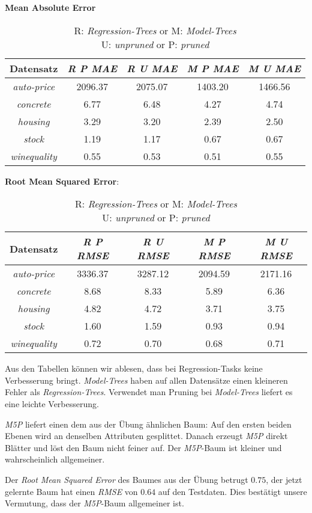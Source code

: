 
\textbf{Mean Absolute Error}

\begin{table}[htb]
	\centering
\begin{tabular}{c|c|c|c|c}
Datensatz  & \emph{R P MAE } & \emph{R U MAE} & \emph{M P MAE} & \emph{M U MAE} \\ \hline
\emph{auto-price}  & 2096.37 & 2075.07& 1403.20 & 1466.56 \\ \hline
\emph{concrete}    & 6.77    & 6.48   & 4.27    & 4.74     \\ \hline
\emph{housing}     & 3.29    & 3.20   & 2.39    & 2.50     \\ \hline
\emph{stock}       & 1.19    & 1.17   & 0.67    & 0.67     \\ \hline
\emph{winequality} & 0.55    & 0.53   & 0.51    & 0.55       
\end{tabular}
\caption{R: \emph{Regression-Trees} or M: \emph{Model-Trees} \\
U: \emph{unpruned} or P: \emph{pruned} }
\end{table}


\textbf{Root Mean Squared Error}:

\begin{table}[htb]
	\centering
\begin{tabular}{c|c|c|c|c}
Datensatz  & \emph{R P RMSE} & \emph{R U RMSE} & \emph{M P RMSE} & \emph{M U RMSE} \\ \hline
\emph{auto-price}  & 3336.37  & 3287.12 & 2094.59 & 2171.16 \\ \hline
\emph{concrete}    & 8.68 & 8.33 & 5.89 & 6.36 \\ \hline
\emph{housing}     & 4.82 & 4.72 & 3.71 & 3.75 \\ \hline
\emph{stock}       & 1.60 & 1.59 & 0.93 & 0.94 \\ \hline
\emph{winequality} & 0.72 & 0.70 & 0.68 & 0.71   
\end{tabular}
\caption{R: \emph{Regression-Trees} or M: \emph{Model-Trees} \\
U: \emph{unpruned} or P: \emph{pruned} }
\end{table}


Aus den Tabellen k\"onnen wir ablesen, dass bei Regression-Tasks keine Verbesserung bringt. \emph{Model-Trees} haben auf allen Datens\"atze einen kleineren Fehler als \emph{Regression-Trees}. Verwendet man Pruning bei \emph{Model-Trees} liefert es eine leichte Verbesserung.


\emph{M5P} liefert einen dem aus der \"Ubung \"ahnlichen Baum: Auf den ersten beiden Ebenen wird an denselben Attributen gesplittet. Danach erzeugt \emph{M5P} direkt Bl\"atter und l\"ost den Baum  nicht feiner auf. Der \emph{M5P}-Baum ist kleiner und wahrscheinlich allgemeiner. 

Der \emph{Root Mean Squared Error} des Baumes aus der \"Ubung betrugt $0.75$, der jetzt gelernte Baum hat einen \emph{RMSE} von $0.64$ auf den Testdaten. Dies best\"atigt unsere Vermutung, dass der \emph{M5P}-Baum allgemeiner ist.